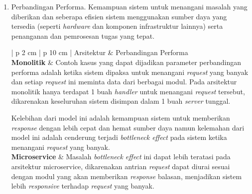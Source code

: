 \begin{enumerate}[leftmargin=*]
\begin{table}[H]
\begin{adjustbox}{width=1\textwidth}
\begin{tabular}{| p {2 cm} | p {10 cm} |}
				Hal ini apabila ditelaah lebih lanjut dikarenakan model \textit{development} yang terikat dengan keterbatasan desain monolitik itu sendiri yang disebabkan tingginya level \textit{coupling}. Kelemahan tingkat \textit{coupling} yang tinggi menjadikan perubahan yang terjadi pada sebuah modul berdampak pada modul lainnya, menjadikan tim pengembang tidak dapat bekerja secara mandiri dan fokus pada modulnya masing-masing.\\
				\hline
				\textbf{Microservice} & Tantangan yang dihadapi oleh perangkat Apertura dapat dapat diperbaiki dengan menerapkan konsep microservice. Ditinjau dari kelebihan arsitektur microservice yang menjadikan sistem lebih mandiri dan \textit{less coupled} mendukung lingkungan \textit{development} untuk menjadi lebih mandiri dan fokus pada modul masing-masing, sehingga perubahan yang tim pengembang lakukan dalam suatu modul tidak akan bertentangan dengan modul lain.\\
				\hline
			\end{tabular}
		\end{adjustbox}
	\end{table}
	\item Perbandingan Performa. Kemampuan sistem untuk menangani masalah yang diberikan dan seberapa efisien sistem menggunakan sumber daya yang tersedia (seperti \textit{hardware} dan komponen infrastruktur lainnya) serta penanganan dan pemrosesan tugas yang tepat.
	\begin{table}[H]
		\small
		\begin{adjustbox}{width=1\textwidth}
			\begin{tabular}{| p {2 cm} | p {10 cm} |}
				\hline
				Arsitektur & Perbandingan Performa\\
				\hline
				\textbf{Monolitik} & Contoh kasus yang dapat dijadikan parameter perbandingan performa adalah ketika sistem dipaksa untuk menangani \textit{request} yang banyak dan setiap \textit{request} ini meminta data dari berbagai modul. Pada arsitektur monolitik hanya terdapat 1 buah \textit{handler} untuk menangani \textit{request} tersebut, dikarenakan keseluruhan sistem disimpan dalam 1 buah \textit{server} tunggal.
				
				Kelebihan dari model ini adalah kemampuan sistem untuk memberikan \textit{response} dengan lebih cepat dan hemat sumber daya namun kelemahan dari model ini adalah cenderung terjadi \textit{bottleneck effect} pada sistem ketika menangani \textit{request} yang banyak.\\
				\hline
				\textbf{Microservice} & Masalah \textit{bottleneck effect} ini dapat lebih teratasi pada arsitektur microservice, dikarenakan antrian \textit{request} dapat diurai sesuai dengan modul yang akan memberikan \textit{response} balasan, menjadikan sistem lebih \textit{responsive} terhadap \textit{request} yang banyak.
				

\end{tabular}
\end{adjustbox}
\end{table}
\end{enumerate}

